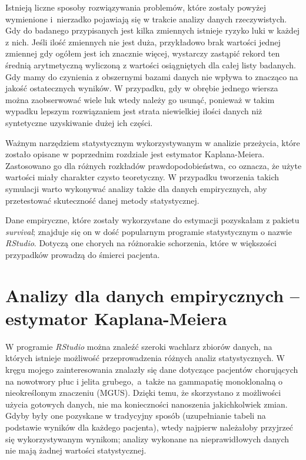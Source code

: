 \documentclass[licencjacka]{pwr_wmat_praca_dyplomowa}
\theoremstyle{plain}
\numberwithin{theorem}{chapter}
\theoremstyle{definition}
\numberwithin{theorem}{chapter}
\begin{document}
Istnieją liczne sposoby rozwiązywania problemów, które zostały powyżej wymienione i~nierzadko pojawiają się w trakcie analizy danych rzeczywistych. Gdy do badanego przypisanych jest kilka zmiennych istnieje ryzyko luki w każdej z nich. Jeśli ilość zmiennych nie jest duża, przykładowo brak wartości jednej zmiennej gdy ogółem jest ich znacznie więcej, wystarczy zastąpić rekord ten średnią arytmetyczną wyliczoną z wartości osiągniętych dla całej listy badanych. Gdy mamy do czynienia z obszernymi bazami danych nie wpływa to znacząco na jakość ostatecznych wyników. W przypadku, gdy w obrębie jednego wiersza można zaobserwować wiele luk wtedy należy go usunąć, ponieważ w takim wypadku lepszym rozwiązaniem jest strata niewielkiej ilości danych niż syntetyczne uzyskiwanie dużej ich części.

Ważnym narzędziem statystycznym wykorzystywanym w analizie przeżycia, które zostało opisane w poprzednim rozdziale jest estymator Kaplana-Meiera. Zastosowano go dla różnych rozkładów prawdopodobieństwa, co oznacza, że użyte wartości miały charakter czysto teoretyczny. W przypadku tworzenia takich symulacji warto wykonywać analizy także dla danych empirycznych, aby przetestować skuteczność danej metody statystycznej. 

Dane empiryczne, które zostały wykorzystane do estymacji pozyskałam z pakietu \textit{survival}; znajduje się on w dość popularnym programie statystycznym o nazwie \textit{RStudio}. Dotyczą one chorych na różnorakie schorzenia, które w większości przypadków prowadzą do śmierci pacjenta. 

\section{Analizy dla danych empirycznych -- estymator Kaplana-Meiera}


W programie \textit{RStudio} można znaleźć szeroki wachlarz zbiorów danych, na których istnieje możliwość przeprowadzenia różnych analiz statystycznych. W kręgu mojego zainteresowania znalazły się dane dotyczące pacjentów chorujących na nowotwory płuc i jelita grubego,~a~także na gammapatię monoklonalną o nieokreślonym znaczeniu (MGUS). Dzięki temu, że skorzystano z możliwości użycia gotowych danych, nie ma konieczności nanoszenia jakichkolwiek zmian. Gdyby były one pozyskane w tradycyjny sposób (uzupełnianie tabeli na podstawie wyników dla każdego pacjenta), wtedy najpierw należałoby przyjrzeć się wykorzystywanym wynikom; analizy wykonane na nieprawidłowych danych nie mają żadnej wartości statystycznej.
\end{document}
